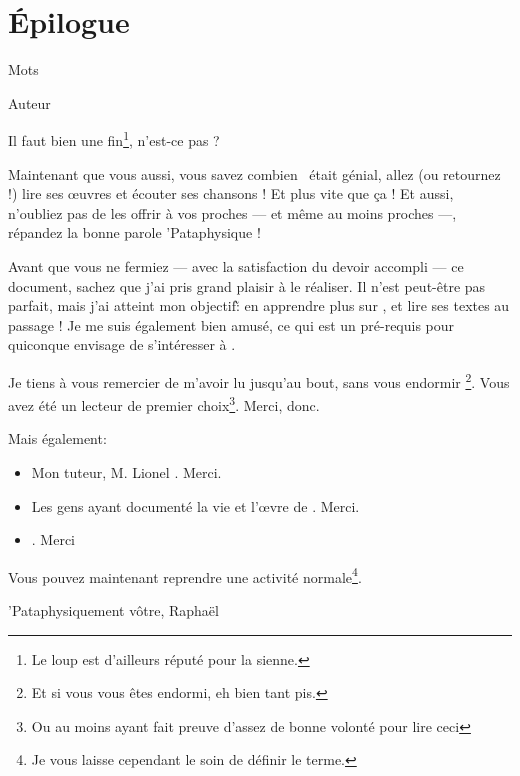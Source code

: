 \backmatter
\chapter{Épilogue}
\epigraph{Mots}
{Auteur}
\vfill
\pagebreak

Il faut bien une fin\footnote{Le loup est d'ailleurs réputé pour la sienne.},
n'est-ce pas ?

Maintenant que vous aussi, vous
savez combien \BV\ était génial, allez (ou retournez !) lire ses
\oe{}uvres et écouter ses chansons ! Et plus vite que ça !
Et aussi, n'oubliez pas de les offrir à vos proches --- et même
au moins proches ---, répandez la bonne parole 'Pataphysique !


Avant que vous ne fermiez --- avec la satisfaction du devoir accompli --- ce document,
sachez que j'ai pris grand plaisir à le réaliser. Il n'est peut-être pas parfait,
mais j'ai atteint mon objectif\~: en apprendre plus sur \BV, et lire ses textes
au passage ! Je me suis également bien amusé, ce qui est un pré-requis pour
quiconque envisage de s'intéresser à \BV.

Je tiens à vous remercier de m'avoir lu jusqu'au bout, sans vous endormir
\footnote{Et si vous vous êtes endormi, eh bien tant pis.}. Vous avez été
un lecteur de premier choix\footnote{Ou au moins ayant fait preuve d'assez de
bonne volonté pour lire ceci}. Merci, donc.

Mais également:
\begin{itemize}
\item Mon tuteur, M. Lionel . Merci.
\item Les gens ayant documenté la vie et l'\oe{}vre de \BV. Merci.
\item \BV. Merci
\end{itemize}

Vous pouvez maintenant reprendre une activité normale\footnote{Je vous laisse
cependant le soin de définir le terme.}.

\vfill
\hfill 'Pataphysiquement vôtre,
\vskip 2cm
\hfill Raphaël
\vskip 2cm

\tableofcontents

